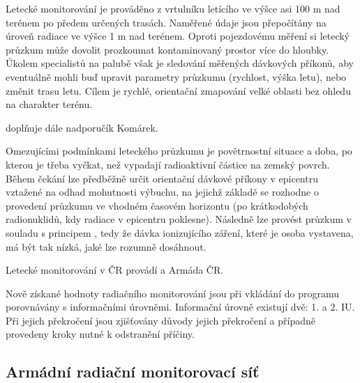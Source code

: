 \begin{itemize}
  Letecké monitorování je prováděno z vrtulníku letícího ve výšce asi
  100 m nad terénem po předem určených trasách. Naměřené údaje jsou
  přepočítány na úroveň radiace ve výšce 1 m nad terénem. Oproti
  pojezdovému měření si letecký průzkum může dovolit prozkoumat
  kontaminovaný prostor více do hloubky. Úkolem specialistů na palubě
  však je sledování měřených dávkových příkonů, aby eventuálně mohli
  buď upravit parametry průzkumu (rychlost, výška letu), nebo změnit
  trasu letu. Cílem je rychlé, orientační zmapování velké oblasti bez
  ohledu na charakter terénu.
	
   doplňuje dále nadporučík
  Komárek.
	
  Omezujícími podmínkami leteckého průzkumu je povětrnostní situace a
  doba, po kterou je třeba vyčkat, než vypadají radioaktivní částice
  na zemský povrch. Během čekání lze předběžně určit orientační
  dávkové příkony v epicentru vztažené na odhad mohutnosti výbuchu, na
  jejichž základě se rozhodne o provedení průzkumu ve vhodném časovém
  horizontu (po  krátkodobých radionuklidů, kdy radiace v
  epicentru poklesne). Následně lze provést průzkum v souladu s
  principem , tedy že dávka ionizujícího záření, které je
  osoba vystavena, má být tak nízká, jaké lze rozumně dosáhnout.
	
  Letecké monitorování v ČR provádí  a Armáda ČR.

\end{itemize}
	
Nově získané hodnoty radiačního monitorování jsou při vkládání do
programu  porovnávány s informačními úrovněmi. Informační
úrovně existují dvě: 1. a 2. IU. Při jejich překročení jsou zjišťovány
důvody jejich překročení a případně provedeny kroky nutné k odstranění
příčiny.
	
\subsection{Armádní radiační monitorovací síť}	
	
	
